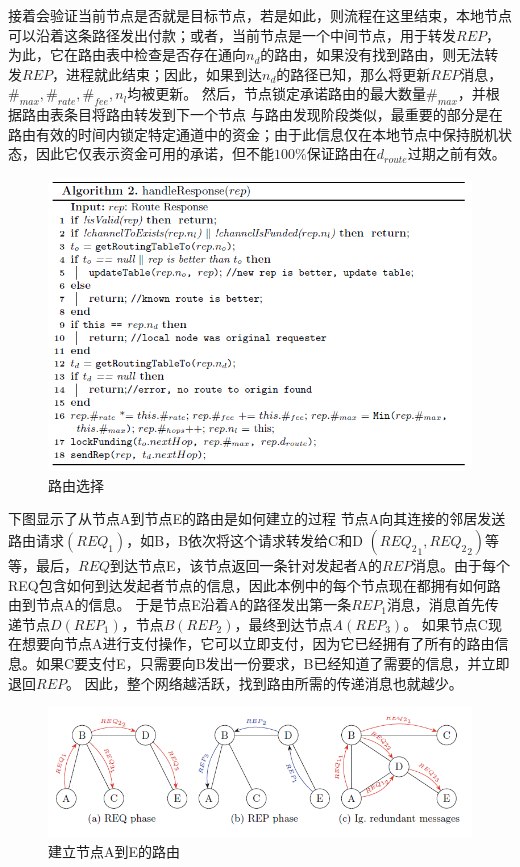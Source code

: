 \documentclass[12pt,a4paper]{article}
\begin{document}
接着会验证当前节点是否就是目标节点，若是如此，则流程在这里结束，本地节点可以沿着这条路径发出付款；或者，当前节点是一个中间节点，用于转发$REP$，为此，它在路由表中检查是否存在通向$n_d$的路由，如果没有找到路由，则无法转发$REP$，进程就此结束；因此，如果到达$n_d$的路径已知，那么将更新$REP$消息，$\#_{max},\#_{rate},\#_{fee},n_l$均被更新。
然后，节点锁定承诺路由的最大数量$\#_{max}$，并根据路由表条目将路由转发到下一个节点
与路由发现阶段类似，最重要的部分是在路由有效的时间内锁定特定通道中的资金；由于此信息仅在本地节点中保持脱机状态，因此它仅表示资金可用的承诺，但不能$100\%$保证路由在$d_{route}$过期之前有效。

\begin{figure}[htb]
\centering
\includegraphics[width=14cm]{select_route}
\caption{路由选择}
\end{figure}

下图显示了从节点A到节点E的路由是如何建立的过程
节点A向其连接的邻居发送路由请求$({REQ}_1)$，如B，B依次将这个请求转发给C和D $({{REQ}_2}_1, {{REQ}_2}_2)$等等，最后，$REQ$到达节点E，该节点返回一条针对发起者A的$REP$消息。由于每个REQ包含如何到达发起者节点的信息，因此本例中的每个节点现在都拥有如何路由到节点A的信息。
于是节点E沿着A的路径发出第一条${REP}_1$消息，消息首先传递节点$D({REP}_1)$，节点$B ({REP}_2)$，最终到达节点$A ({REP}_3)$。
如果节点C现在想要向节点A进行支付操作，它可以立即支付，因为它已经拥有了所有的路由信息。如果C要支付E，只需要向B发出一份要求，B已经知道了需要的信息，并立即退回$REP$。
因此，整个网络越活跃，找到路由所需的传递消息也就越少。

\begin{figure}[htb]
\centering
\includegraphics[width=14cm]{create_route}
\caption{建立节点A到E的路由}
\end{figure}

\clearpage


\end{document}
